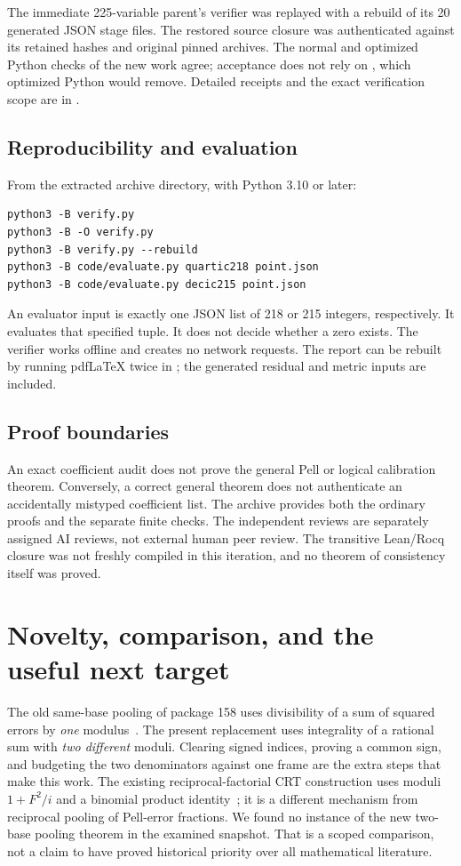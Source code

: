 \documentclass[11pt,letterpaper]{article}
\theoremstyle{definition}\newtheorem{definition}[theorem]{Definition}
\theoremstyle{remark}\newtheorem{remark}[theorem]{Remark}
\newcommand{\code}[1]{\texttt{\detokenize{#1}}}
\begin{document}
The immediate 225-variable parent's verifier was replayed with a rebuild
of its 20 generated JSON stage files. The restored source closure was
authenticated against its retained hashes and original pinned archives.
The normal and optimized Python checks of the new work agree; acceptance
does not rely on \code{assert}, which optimized Python would remove.
Detailed receipts and the exact verification scope are in
\code{verification/}.

\subsection{Reproducibility and evaluation}

From the extracted archive directory, with Python 3.10 or later:
\begin{verbatim}
python3 -B verify.py
python3 -B -O verify.py
python3 -B verify.py --rebuild
python3 -B code/evaluate.py quartic218 point.json
python3 -B code/evaluate.py decic215 point.json
\end{verbatim}
An evaluator input is exactly one JSON list of 218 or 215 integers,
respectively. It evaluates that specified tuple. It does not decide
whether a zero exists. The verifier works offline and creates no network
requests. The report can be rebuilt by running pdfLaTeX twice in
\code{report/}; the generated residual and metric inputs are included.

\subsection{Proof boundaries}

An exact coefficient audit does not prove the general Pell or logical
calibration theorem. Conversely, a correct general theorem does not
authenticate an accidentally mistyped coefficient list. The archive
provides both the ordinary proofs and the separate finite checks.
The independent reviews are separately assigned AI reviews, not external
human peer review. The transitive Lean/Rocq closure was not freshly
compiled in this iteration, and no theorem of consistency itself was
proved.

\section{Novelty, comparison, and the useful next target}

The old same-base pooling of package 158 uses divisibility of a sum of
squared errors by \emph{one} modulus~\cite{parent158}. The present
replacement uses integrality of a rational sum with \emph{two different}
moduli. Clearing signed indices, proving a common sign, and budgeting
the two denominators against one frame are the extra steps that make
this work. The existing reciprocal-factorial CRT construction uses
moduli $1+F^2/i$ and a binomial product identity~\cite{reciprocal660};
it is a different mechanism from reciprocal pooling of Pell-error
fractions. We found no instance of the new two-base pooling theorem in
the examined snapshot. That is a scoped comparison, not a claim to
have proved historical priority over all mathematical literature.
\end{document}
